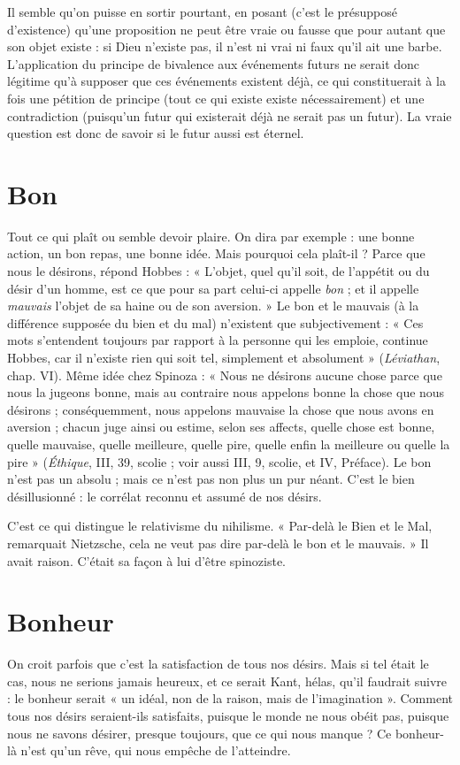 Il semble qu’on puisse en sortir pourtant, en posant (c’est le présupposé
d’existence) qu’une proposition ne peut être vraie ou fausse que pour autant
que son objet existe : si Dieu n'existe pas, il n’est ni vrai ni faux qu'il ait une
barbe. L'application du principe de bivalence aux événements futurs ne serait
donc légitime qu’à supposer que ces événements existent déjà, ce qui constituerait
à la fois une pétition de principe (tout ce qui existe existe nécessairement)
et une contradiction (puisqu’un futur qui existerait déjà ne serait pas un futur).
La vraie question est donc de savoir si le futur aussi est éternel.

\section{Bon}
Tout ce qui plaît ou semble devoir plaire. On dira par exemple : une
bonne action, un bon repas, une bonne idée. Mais pourquoi cela plaît-il ?
Parce que nous le désirons, répond Hobbes : « L'objet, quel qu’il soit, de
l'appétit ou du désir d’un homme, est ce que pour sa part celui-ci appelle {\it bon} ;
et il appelle {\it mauvais} l’objet de sa haine ou de son aversion. » Le bon et le mauvais
(à la différence supposée du bien et du mal) n’existent que subjectivement :
« Ces mots s'entendent toujours par rapport à la personne qui les emploie,
continue Hobbes, car il n'existe rien qui soit tel, simplement et absolument »
({\it Léviathan}, chap. VI). Même idée chez Spinoza : « Nous ne désirons aucune
chose parce que nous la jugeons bonne, mais au contraire nous appelons bonne
la chose que nous désirons ; conséquemment, nous appelons mauvaise la chose
que nous avons en aversion ; chacun juge ainsi ou estime, selon ses affects,
quelle chose est bonne, quelle mauvaise, quelle meilleure, quelle pire, quelle
enfin la meilleure ou quelle la pire » ({\it Éthique}, III, 39, scolie ; voir aussi III, 9,
scolie, et IV, Préface). Le bon n’est pas un absolu ; mais ce n’est pas non plus
un pur néant. C’est le bien désillusionné : le corrélat reconnu et assumé de nos
désirs.

C’est ce qui distingue le relativisme du nihilisme. « Par-delà le Bien et le
Mal, remarquait Nietzsche, cela ne veut pas dire par-delà le bon et le mauvais. »
Il avait raison. C’était sa façon à lui d’être spinoziste.

\section{Bonheur}
On croit parfois que c’est la satisfaction de tous nos désirs. Mais
si tel était le cas, nous ne serions jamais heureux, et ce serait
Kant, hélas, qu’il faudrait suivre : le bonheur serait « un idéal, non de la raison,
mais de l’imagination ». Comment tous nos désirs seraient-ils satisfaits, puisque
le monde ne nous obéit pas, puisque nous ne savons désirer, presque toujours,
que ce qui nous manque ? Ce bonheur-là n’est qu’un rêve, qui nous empêche
de l'atteindre.

